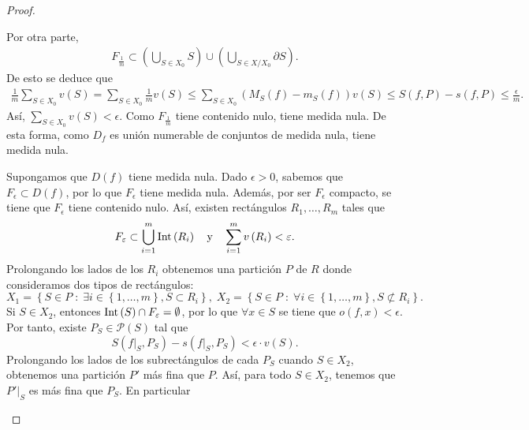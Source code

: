 \begin{proof}
\begin{description}
Por otra parte,
\[
\begin{split}
F_{\frac{1}{m}} \subset \left(\bigcup_{S \in X_{0}}S\right) \cup \left(\bigcup_{S \in X/X_{0}}\partial S\right) .
\end{split}
\]
De esto se deduce que
\[
\begin{split}
	\frac{1}{m}\sum^{}_{S\in X_{0}}v\left(S\right)=\sum^{}_{S\in X_{0}}\frac{1}{m}v\left(S\right)\leq \sum^{}_{S \in X_{0}}\left(M_{S}\left(f\right)-m_{S}\left(f\right)\right)v\left(S\right) 
	\leq  S\left(f,P\right)-s\left(f,P\right)\leq \frac{\epsilon }{m}.
\end{split}
\]
Así, $\displaystyle \sum^{}_{S \in X_{0}}v\left(S\right)<\epsilon  $. Como $\displaystyle F_{\frac{1}{m}} $ tiene contenido nulo, tiene medida nula. De esta forma, como $\displaystyle D_{f} $ es unión numerable de conjuntos de medida nula, tiene medida nula. 
\item[(ii)] Supongamos que $\displaystyle D\left(f\right)$ tiene medida nula. Dado $\displaystyle \epsilon > 0 $, sabemos que $\displaystyle F_{\epsilon } \subset D\left(f\right) $, por lo que $\displaystyle F_{\epsilon } $ tiene medida nula. Además, por ser $\displaystyle F_{\epsilon } $ compacto, se tiene que $\displaystyle F_{\epsilon } $ tiene contenido nulo. Así, existen rectángulos $\displaystyle R_{1}, \ldots, R_{m} $ tales que 
	\[F_{\varepsilon }\subset \bigcup_{i = 1}^{m}\operatorname{Int}\left(R_{i}\right) \quad \text{y} \quad \sum^{m}_{i = 1}v\left(R_{i}\right) < \varepsilon  .\]
	Prolongando los lados de los $\displaystyle R_{i} $ obtenemos una partición $\displaystyle P $ de $\displaystyle R $ donde consideramos dos tipos de rectángulos:
	\[X_{1} = \left\{ S \in P \; : \; \exists i \in \left\{ 1, \ldots, m\right\} , S \subset R_{i}\right\} , \; X_{2}= \left\{ S \in P \; : \; \forall i \in \left\{ 1, \ldots, m\right\} , S \not\subset R_{i}\right\}  .\]
Si $\displaystyle S \in X_{2} $, entonces $\displaystyle \operatorname{Int}\left(S\right)\cap F_{\varepsilon } = \emptyset $, por lo que $\displaystyle \forall x \in S $ se tiene que $\displaystyle o\left(f,x\right) < \epsilon  $. Por tanto, existe $\displaystyle P_{S} \in \mathcal{P}\left(S\right) $ tal que 
\[S\left(f|_{S}, P_{S}\right)-s\left(f|_{S}, P_{S}\right) < \epsilon \cdot v\left(S\right) .\]
Prolongando los lados de los subrectángulos de cada $\displaystyle P_{S} $ cuando $\displaystyle S \in X_{2} $, obtenemos una partición $\displaystyle P' $ más fina que $\displaystyle P $. Así, para todo $\displaystyle S \in X_{2} $, tenemos que $\displaystyle P'|_{S} $ es más fina que $\displaystyle P_{S} $. En particular

\end{description}
\end{proof}
